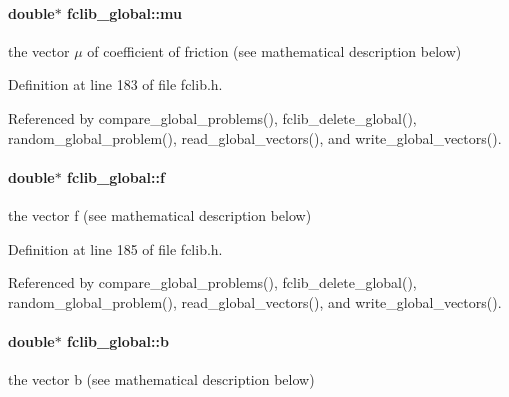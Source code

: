 \hypertarget{structfclib__global_a99fd8c775c35a6a0e233df1f8cae181a}{
\paragraph[{mu}]{\setlength{\rightskip}{0pt plus 5cm}double$\ast$ fclib\-\_\-global\-::mu}}\label{structfclib__global_a99fd8c775c35a6a0e233df1f8cae181a}


the vector $\mu$ of coefficient of friction (see mathematical description below) 



Definition at line 183 of file fclib.\-h.



Referenced by compare\-\_\-global\-\_\-problems(), fclib\-\_\-delete\-\_\-global(), random\-\_\-global\-\_\-problem(), read\-\_\-global\-\_\-vectors(), and write\-\_\-global\-\_\-vectors().

\hypertarget{structfclib__global_a6d5d0d1f9169b886eb3d3aca0632e8a9}{
\paragraph[{f}]{\setlength{\rightskip}{0pt plus 5cm}double$\ast$ fclib\-\_\-global\-::f}}\label{structfclib__global_a6d5d0d1f9169b886eb3d3aca0632e8a9}


the vector f (see mathematical description below) 



Definition at line 185 of file fclib.\-h.



Referenced by compare\-\_\-global\-\_\-problems(), fclib\-\_\-delete\-\_\-global(), random\-\_\-global\-\_\-problem(), read\-\_\-global\-\_\-vectors(), and write\-\_\-global\-\_\-vectors().

\hypertarget{structfclib__global_a1badf3df92b120566a2ee3c42194972f}{
\paragraph[{b}]{\setlength{\rightskip}{0pt plus 5cm}double$\ast$ fclib\-\_\-global\-::b}}\label{structfclib__global_a1badf3df92b120566a2ee3c42194972f}


the vector b (see mathematical description below) 




